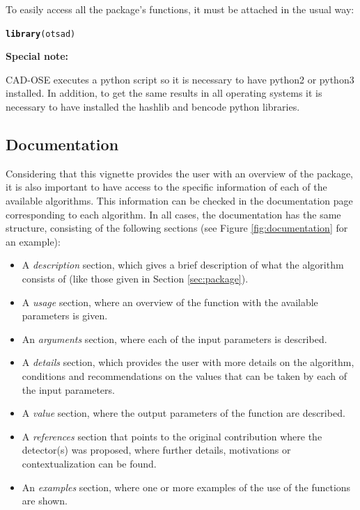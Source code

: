 \documentclass[a4paper]{article}\usepackage[]{graphicx}\usepackage[]{color}
\makeatletter
\newcommand{\hlstd}[1]{\textcolor[rgb]{0.345,0.345,0.345}{#1}}%
\newcommand{\hlkwd}[1]{\textcolor[rgb]{0.737,0.353,0.396}{\textbf{#1}}}%
\newenvironment{kframe}{%
 \def\at@end@of@kframe{}%
 \ifinner\ifhmode%
  \def\at@end@of@kframe{\end{minipage}}%
  \begin{minipage}{\columnwidth}%
 \fi\fi%
 \def\FrameCommand##1{\hskip\@totalleftmargin \hskip-\fboxsep
 \colorbox{shadecolor}{##1}\hskip-\fboxsep
     \hskip-\linewidth \hskip-\@totalleftmargin \hskip\columnwidth}%
 \MakeFramed {\advance\hsize-\width
   \@totalleftmargin\z@ \linewidth\hsize
   \@setminipage}}%
 {\par\unskip\endMakeFramed%
 \at@end@of@kframe}
\newenvironment{knitrout}{}{} %
\makeatother
\begin{document}
To easily access all the package’s functions, it must be attached in the usual way:

\begin{knitrout}
\color{fgcolor}\begin{kframe}
\begin{alltt}
\hlkwd{library}\hlstd{(otsad)}
\end{alltt}
\end{kframe}
\end{knitrout}

\textbf{Special note: }

CAD-OSE executes a python script so it is necessary to have python2 or python3 installed. In addition, to get the same results in all operating systems it is necessary to have installed the hashlib and bencode python libraries.

\subsection{Documentation}\label{sec:documentation}

Considering that this vignette provides the user with an overview of the  package, it is also important to have access to the specific information of each of the available algorithms. This information can be checked in the documentation page corresponding to each algorithm. In all cases, the documentation has the same structure, consisting of the following sections (see Figure \ref{fig:documentation} for an example):

\begin{itemize}
\item A \emph{description} section, which gives a brief description of what the algorithm consists of (like those given in Section \ref{sec:package}).
\item A \emph{usage} section, where an overview of the function with the available parameters is given.
\item An \emph{arguments} section, where each of the input parameters is described.
\item A \emph{details} section, which provides the user with more details on the algorithm, conditions and recommendations on the values that can be taken by each of the input parameters.
\item A \emph{value} section, where the output parameters of the function are described.
\item A \emph{references} section that points to the original contribution where the detector(s) was proposed, where further details, motivations or contextualization can be found.
\item An \emph{examples} section, where one or more examples of the use of the functions are shown.
\end{itemize}
\end{document}
